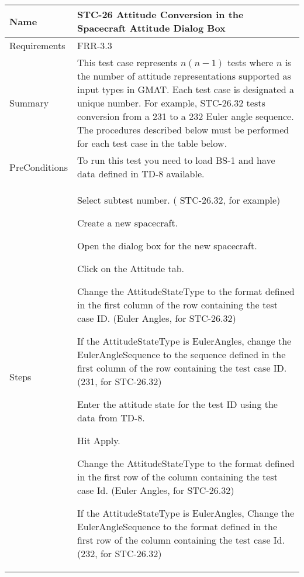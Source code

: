 \begin{table}[htbp!]
\centering
      \begin{tabular}{|p{1.0 in} |p{5.0 in} |}
         \hline
          \rowcolor[rgb]{0.8,0.8,0.8}  Name & STC-26 Attitude Conversion in the Spacecraft Attitude Dialog Box\\
         \hline
         Requirements & FRR-3.3\\ \hline
         Summary & This test case represents $n(n-1)$ tests where $n$ is the number of attitude representations
         supported as input types in GMAT.  Each test case is designated a unique number.  For example,
         STC-26.32 tests conversion from a 231 to a 232 Euler angle sequence.  The procedures described below
         must be performed for each test case in the table below.   \\ \hline
         PreConditions & To run this test you need to load BS-1 and have data defined in TD-8 available.\\ \hline
         Steps &
          \begin{compactenum}
             \item Select subtest number. ( STC-26.32, for example)
             \item Create a new spacecraft.
             \item Open the dialog box for the new spacecraft.
             \item Click on the Attitude tab.
             \item Change the AttitudeStateType to the format defined in the first column of
                   the row containing the test case ID.  (Euler Angles, for STC-26.32)
             \item If the AttitudeStateType is EulerAngles, change the EulerAngleSequence to the
                   sequence defined in the first column of
                   the row containing the test case ID.  (231, for STC-26.32)
             \item Enter the attitude state for the test ID using the data from TD-8.
             \item Hit Apply.
             \item Change the AttitudeStateType to the format defined in the first row of the column containing  the test case Id. (Euler Angles, for STC-26.32)
             \item If the AttitudeStateType is EulerAngles, Change the EulerAngleSequence to the format defined in the first row of the column containing  the test case Id. (232, for STC-26.32)

\end{compactenum}
\end{tabular}
\end{table}
